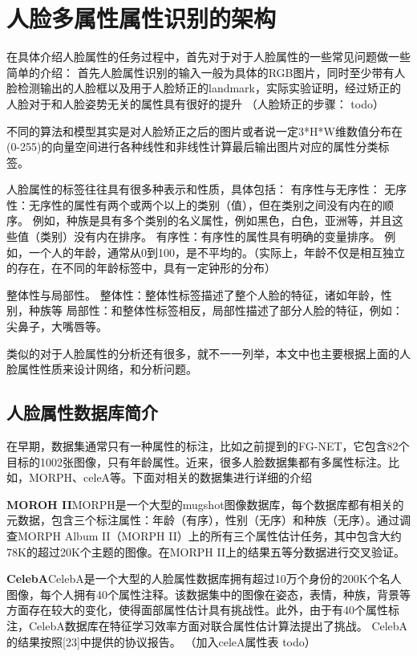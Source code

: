 \chapter{人脸多属性属性识别的架构}
在具体介绍人脸属性的任务过程中，首先对于对于人脸属性的一些常见问题做一些简单的介绍：
首先人脸属性识别的输入一般为具体的RGB图片，同时至少带有人脸检测输出的人脸框以及用于人脸矫正的landmark，实际实验证明，经过矫正的人脸对于和人脸姿势无关的属性具有很好的提升
（人脸矫正的步骤： todo）

不同的算法和模型其实是对人脸矫正之后的图片或者说一定3*H*W维数值分布在(0-255)的向量空间进行各种线性和非线性计算最后输出图片对应的属性分类标签。

人脸属性的标签往往具有很多种表示和性质，具体包括：
有序性与无序性：
无序性：无序性的属性有两个或两个以上的类别（值），但在类别之间没有内在的顺序。 例如，种族是具有多个类别的名义属性，例如黑色，白色，亚洲等，并且这些值（类别）没有内在排序。
有序性：有序性的属性具有明确的变量排序。 例如，一个人的年龄，通常从0到100，是不平均的。（实际上，年龄不仅是相互独立的存在，在不同的年龄标签中，具有一定钟形的分布）

整体性与局部性。 
整体性：整体性标签描述了整个人脸的特征，诸如年龄，性别，种族等
局部性：和整体性标签相反，局部性描述了部分人脸的特征，例如：尖鼻子，大嘴唇等。

类似的对于人脸属性的分析还有很多，就不一一列举，本文中也主要根据上面的人脸属性性质来设计网络，和分析问题。



\section{人脸属性数据库简介}
在早期，数据集通常只有一种属性的标注，比如之前提到的FG-NET，它包含82个目标的1002张图像，只有年龄属性。近来，很多人脸数据集都有多属性标注。比如，MORPH、celeA等。下面对相关的数据集进行详细的介绍

\textbf{MOROH II}MORPH是一个大型的mugshot图像数据库，每个数据库都有相关的元数据，包含三个标注属性：年龄（有序），性别（无序）和种族（无序）。通过调查MORPH Album II（MORPH II）上的所有三个属性估计任务，其中包含大约78K的超过20K个主题的图像。在MORPH II上的结果五等分数据进行交叉验证。

\textbf{CelebA}CelebA是一个大型的人脸属性数据库拥有超过10万个身份的200K个名人图像，每个人拥有40个属性注释。该数据集中的图像在姿态，表情，种族，背景等方面存在较大的变化，使得面部属性估计具有挑战性。此外，由于有40个属性标注，CelebA数据库在特征学习效率方面对联合属性估计算法提出了挑战。 CelebA的结果按照[23]中提供的协议报告。 
（加入celeA属性表 todo）

